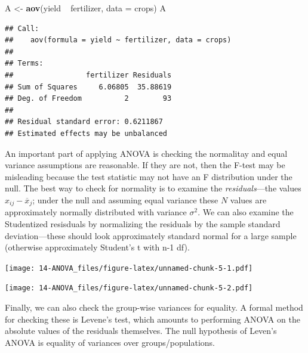 \documentclass[]{book}
\newenvironment{Shaded}{\begin{snugshade}}{\end{snugshade}}
\newcommand{\KeywordTok}[1]{\textcolor[rgb]{0.13,0.29,0.53}{\textbf{{#1}}}}
\newcommand{\DataTypeTok}[1]{\textcolor[rgb]{0.13,0.29,0.53}{{#1}}}
\newcommand{\StringTok}[1]{\textcolor[rgb]{0.31,0.60,0.02}{{#1}}}
\newcommand{\NormalTok}[1]{{#1}}
\begin{document}
\begin{Shaded}
\begin{Highlighting}[]
\NormalTok{A <-}\StringTok{ }\KeywordTok{aov}\NormalTok{(yield ~}\StringTok{ }\NormalTok{fertilizer, }\DataTypeTok{data =} \NormalTok{crops)}
\NormalTok{A}
\end{Highlighting}
\end{Shaded}

\begin{verbatim}
## Call:
##    aov(formula = yield ~ fertilizer, data = crops)
## 
## Terms:
##                 fertilizer Residuals
## Sum of Squares     6.06805  35.88619
## Deg. of Freedom          2        93
## 
## Residual standard error: 0.6211867
## Estimated effects may be unbalanced
\end{verbatim}

An important part of applying ANOVA is checking the normalitay and equal
variance assumptions are reasonable. If they are not, then the F-test
may be misleading because the test statistic may not have an F
distribution under the null. The best way to check for normality is to
examine the \emph{residuals}---the values \(x_{ij} - \overline x_{j}\);
under the null and assuming equal variance these \(N\) values are
approximately normally distributed with variance \(\sigma^2\). We can
also examine the Studentized resisduals by normalizing the residuals by
the sample standard deviation---these should look approximately standard
normal for a large sample (otherwise approximately Student's t with n-1
df).

\begin{Shaded}
\end{Shaded}

\texttt{[image: 14-ANOVA\_files/figure-latex/unnamed-chunk-5-1.pdf]}

\begin{Shaded}
\end{Shaded}

\texttt{[image: 14-ANOVA\_files/figure-latex/unnamed-chunk-5-2.pdf]}

Finally, we can also check the group-wise variances for equality. A
formal method for checking these is Levene's test, which amounts to
performing ANOVA on the absolute values of the residuals themselves. The
null hypothesis of Leven's ANOVA is equality of variances over
groups/populations.
\end{document}
